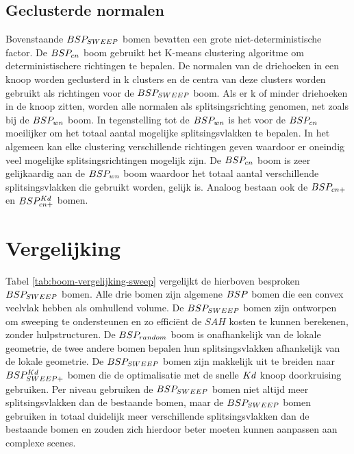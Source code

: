     

    
\subsection{Geclusterde normalen}
    Bovenstaande $BSP_{SWEEP}$ bomen bevatten een grote niet-deterministische factor.
    De $BSP_{cn}$ boom gebruikt het K-means clustering algoritme om deterministischere richtingen te bepalen.
    De normalen van de driehoeken in een knoop worden geclusterd in k clusters en de centra van deze clusters worden gebruikt als richtingen voor de $BSP_{SWEEP}$ boom.
    Als er k of minder driehoeken in de knoop zitten, worden alle normalen als splitsingsrichting genomen, net zoals bij de $BSP_{wn}$ boom.
    In tegenstelling tot de $BSP_{wn}$ is het voor de $BSP_{cn}$ moeilijker om het totaal aantal mogelijke splitsingsvlakken te bepalen.
    In het algemeen kan elke clustering verschillende richtingen geven waardoor er oneindig veel mogelijke splitsingsrichtingen mogelijk zijn.
    De $BSP_{cn}$ boom is zeer gelijkaardig aan de $BSP_{wn}$ boom waardoor het totaal aantal verschillende splitsingsvlakken die gebruikt worden, gelijk is. Analoog bestaan ook de $BSP_{cn+}$ en $BSP^{Kd}_{cn+}$ bomen.





\section{Vergelijking}
Tabel \ref{tab:boom-vergelijking-sweep} vergelijkt de hierboven besproken $BSP_{SWEEP}$ bomen.
Alle drie bomen zijn algemene $BSP$ bomen die een convex veelvlak hebben als omhullend volume.
De $BSP_{SWEEP}$ bomen zijn ontworpen om sweeping te ondersteunen en zo efficiënt de $SAH$ kosten te kunnen berekenen, zonder hulpstructuren.
De $BSP_{random}$ boom is onafhankelijk van de lokale geometrie, de twee andere bomen bepalen hun splitsingsvlakken afhankelijk van de lokale geometrie.
De $BSP_{SWEEP}$ bomen zijn makkelijk uit te breiden naar $BSP^{Kd}_{SWEEP+}$ bomen die de optimalisatie met de snelle $Kd$ knoop doorkruising gebruiken.
Per niveau gebruiken de $BSP_{SWEEP}$ bomen niet altijd meer splitsingsvlakken dan de bestaande bomen, maar de $BSP_{SWEEP}$ bomen gebruiken in totaal duidelijk meer verschillende splitsingsvlakken dan de bestaande bomen en zouden zich hierdoor beter moeten kunnen aanpassen aan complexe scenes.

